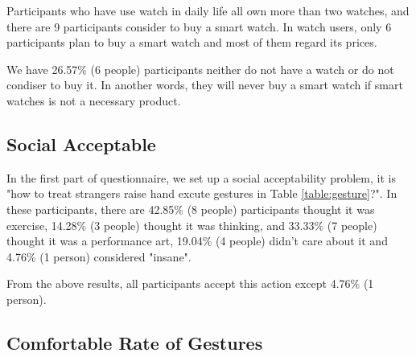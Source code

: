 Participants who have use watch in daily life all own more than two watches, and there are 9 participants consider to buy a smart watch. In watch users, only 6 participants plan to buy a smart watch and most of them regard its prices.

We have 26.57\% (6 people) participants neither do not have a watch or do not condiser to buy it. In another words, they will never buy a smart watch if smart watches is not a necessary product.


\subsection{Social Acceptable}

In the first part of questionnaire, we set up a social acceptability problem, it is "how to treat strangers raise hand excute gestures in Table \ref{table:gesture}?". In these participants, there are 42.85\% (8 people) participants thought it was exercise, 14.28\% (3 people) thought it was thinking, and 33.33\% (7 people) thought it was a performance art, 19.04\% (4 people) didn't care about it and 4.76\% (1 person) considered "insane".

From the above results, all participants accept this action except 4.76\% (1 person).

\subsection{Comfortable Rate of Gestures}

